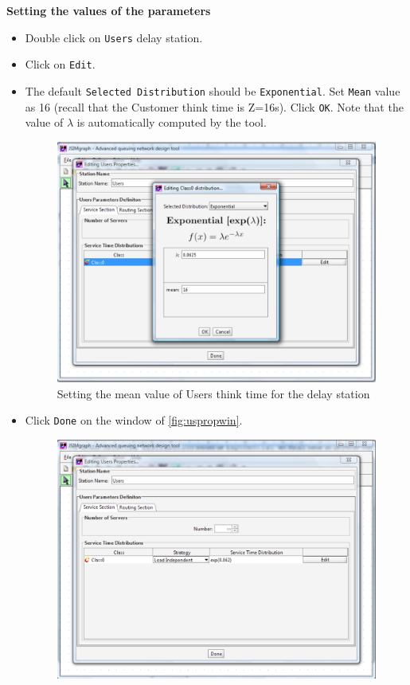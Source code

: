 \noindent \textbf{Setting the values of the parameters}
\begin{itemize} \item
Double click on \texttt{Users} delay station. \item  Click on
\texttt{Edit}. \item The default \texttt{Selected Distribution}
should be \texttt{Exponential}. Set \texttt{Mean} value as 16
(recall that the Customer think time is Z=16s). Click \texttt{OK}.
Note that the value of $\lambda$ is automatically computed by the
tool.

\begin{figure}[htb]
    \begin{center}
        \includegraphics[scale=.5]{img/jsimg/12.3.eps}
    \end{center}
    \caption{Setting the mean value of Users think time for the delay station}
    \label{fig:meanthin}
\end{figure}
\item Click \texttt{Done} on the window of
\autoref{fig:uspropwin}.
\begin{figure}[htb]
    \begin{center}
        \includegraphics[scale=.5]{img/jsimg/12.4.eps}

\end{center}
\end{figure}
\end{itemize}
